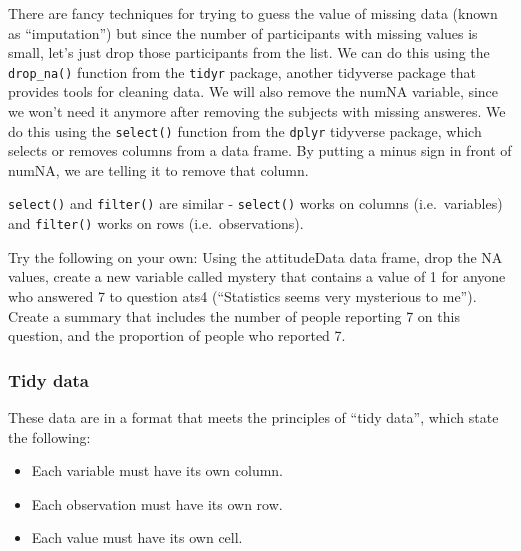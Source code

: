 \documentclass[12pt,]{book}
\newenvironment{Shaded}{\begin{snugshade}}{\end{snugshade}}
\newcommand{\CommentTok}[1]{\textcolor[rgb]{0.56,0.35,0.01}{\textit{#1}}}
\newcommand{\KeywordTok}[1]{\textcolor[rgb]{0.13,0.29,0.53}{\textbf{#1}}}
\newcommand{\NormalTok}[1]{#1}
\newcommand{\OperatorTok}[1]{\textcolor[rgb]{0.81,0.36,0.00}{\textbf{#1}}}
\newcommand{\StringTok}[1]{\textcolor[rgb]{0.31,0.60,0.02}{#1}}
\providecommand{\tightlist}{%
  \setlength{\itemsep}{0pt}\setlength{\parskip}{0pt}}
\begin{document}
There are fancy techniques for trying to guess the value of missing data (known as ``imputation'') but since the number of participants with missing values is small, let's just drop those participants from the list. We can do this using the \texttt{drop\_na()} function from the \texttt{tidyr} package, another tidyverse package that provides tools for cleaning data. We will also remove the numNA variable, since we won't need it anymore after removing the subjects with missing answeres. We do this using the \texttt{select()} function from the \texttt{dplyr} tidyverse package, which selects or removes columns from a data frame. By putting a minus sign in front of numNA, we are telling it to remove that column.

\texttt{select()} and \texttt{filter()} are similar - \texttt{select()} works on columns (i.e.~variables) and \texttt{filter()} works on rows (i.e.~observations).

\begin{Shaded}
\end{Shaded}

Try the following on your own: Using the attitudeData data frame, drop the NA values, create a new variable called mystery that contains a value of 1 for anyone who answered 7 to question ats4 (``Statistics seems very mysterious to me''). Create a summary that includes the number of people reporting 7 on this question, and the proportion of people who reported 7.

\hypertarget{tidy-data}{%
\subsubsection{Tidy data}\label{tidy-data}}

These data are in a format that meets the principles of ``tidy data'', which state the following:

\begin{itemize}
\tightlist
\item
  Each variable must have its own column.
\item
  Each observation must have its own row.
\item
  Each value must have its own cell.
\end{itemize}
\end{document}
